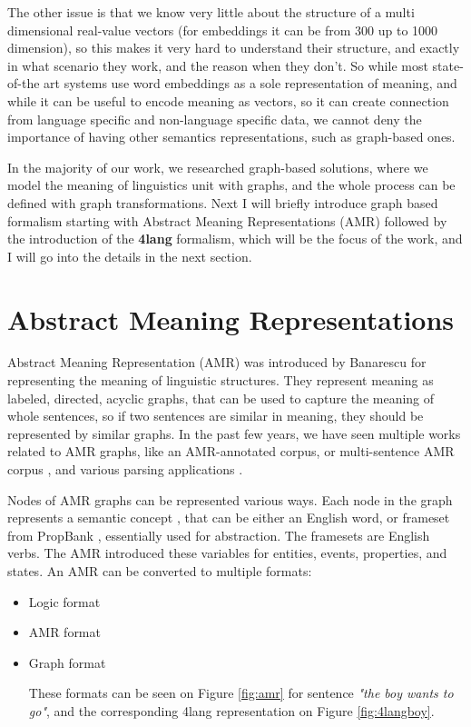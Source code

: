 The other issue is that we know very little about the structure of a multi dimensional real-value vectors (for embeddings it can be from 300 up to 1000 dimension), so this makes it very hard to understand their structure, and exactly in what scenario they work, and the reason when they don't. So while most state-of-the art systems use word embeddings as a sole representation of meaning, and while it can be useful to encode meaning as vectors, so it can create connection from language specific and non-language specific data, we cannot deny the importance of having other semantics representations, such as graph-based ones. 

In the majority of our work, we researched graph-based solutions, where we model the meaning of linguistics unit with graphs, and the whole process can be defined with graph transformations. Next I will briefly introduce graph based formalism starting with Abstract Meaning Representations (AMR) followed by the introduction of the \textbf{4lang} formalism, which will be the focus of the work, and I will go into the details in the next section.

\section{Abstract Meaning Representations}
Abstract Meaning Representation (AMR) was introduced by Banarescu\cite{Banarescu:2013} for representing the meaning of linguistic structures. They represent meaning as labeled, directed, acyclic graphs, that can be used to capture the meaning of whole sentences, so if two sentences are similar in meaning, they should be represented by similar graphs. In the past few years, we have seen multiple works related to AMR graphs, like an AMR-annotated corpus\cite{Banarescu:2013}, or multi-sentence AMR corpus \cite{OGorman2018AMRBT}, and various parsing applications \cite{DAC:2017} \cite{Vanderwende:2015}.

Nodes of AMR graphs can be represented various ways. Each node in the graph represents a semantic concept \cite{AMR:2015}, that can be either an English word, or frameset from PropBank \cite{Palmer:2005}, essentially used for abstraction. The framesets are English verbs. The AMR introduced these variables for entities, events, properties, and states. An AMR can be converted to multiple formats:
\begin{itemize}
	\item Logic format
	\item AMR format
	\item Graph format
	
	These formats can be seen on Figure \ref{fig:amr} for sentence \textit{"the boy wants to go"}, and the corresponding 4lang representation on Figure \ref{fig:4langboy}.
	
\end{itemize}


